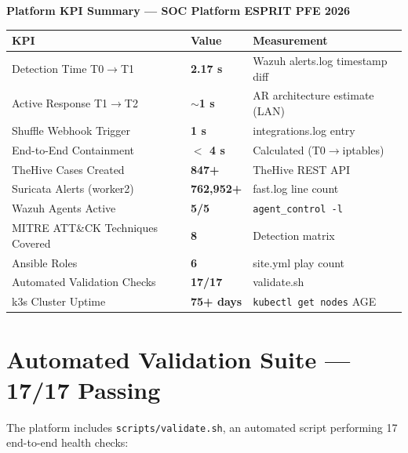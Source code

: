 \documentclass[12pt,a4paper]{report}
\begin{document}
\begin{kpibox}
\textbf{Platform KPI Summary --- SOC Platform ESPRIT PFE 2026}

\begin{center}
\begin{tabular}{lll}
\toprule
\textbf{KPI} & \textbf{Value} & \textbf{Measurement} \\
\midrule
Detection Time T0$\rightarrow$T1    & \textbf{2.17 s}       & Wazuh alerts.log timestamp diff \\
Active Response T1$\rightarrow$T2   & \textbf{$\sim$1 s}    & AR architecture estimate (LAN) \\
Shuffle Webhook Trigger             & \textbf{1 s}          & integrations.log entry \\
End-to-End Containment              & \textbf{$<$ 4 s}      & Calculated (T0$\rightarrow$iptables) \\
TheHive Cases Created               & \textbf{847+}         & TheHive REST API \\
Suricata Alerts (worker2)           & \textbf{762,952+}     & fast.log line count \\
Wazuh Agents Active                 & \textbf{5/5}          & \texttt{agent\_control -l} \\
MITRE ATT\&CK Techniques Covered    & \textbf{8}            & Detection matrix \\
Ansible Roles                       & \textbf{6}            & site.yml play count \\
Automated Validation Checks         & \textbf{17/17}        & validate.sh \\
k3s Cluster Uptime                  & \textbf{75+ days}     & \texttt{kubectl get nodes} AGE \\
\bottomrule
\end{tabular}
\end{center}
\end{kpibox}

\section{Automated Validation Suite --- 17/17 Passing}

The platform includes \texttt{scripts/validate.sh}, an automated script performing 17 end-to-end health checks:
\end{document}
